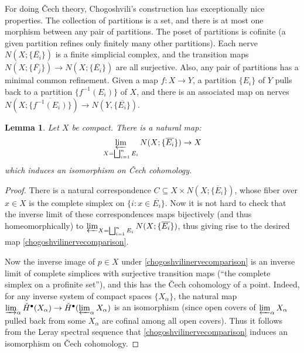 \documentclass[12pt]{article}
\newtheorem{lemma}[theorem]{Lemma}
\theoremstyle{definition}
\theoremstyle{remark}
\numberwithin{equation}{subsection}
\newcommand{\cH}{\check H}
\begin{document}
For doing \v Cech theory, Chogoshvili's construction has exceptionally nice properties.  The collection of partitions is a set, and there is at most one morphism between any pair of partitions.  The poset of partitions is cofinite (a given partition refines only finitely many other partitions).  Each nerve $N(X;\{\overline{E_i}\})$ is a finite simplicial complex, and the transition maps $N(X;\{\overline{F_j}\})\to N(X;\{\overline{E_i}\})$ are all surjective.  Also, any pair of partitions has a minimal common refinement.  Given a map $f:X\to Y$, a partition $\{E_i\}$ of $Y$ pulls back to a partition $\{f^{-1}(E_i)\}$ of $X$, and there is an associated map on nerves $N(X;\{\overline{f^{-1}(E_i)}\})\to N(Y,\{\overline{E_i}\})$.

\begin{lemma}\label{inverselimithassamecech}
Let $X$ be compact.  There is a natural map:
\begin{equation}\label{chogoshvilinervecomparison}
\varprojlim_{X=\bigsqcup_{i=1}^nE_i}N(X;\{\overline{E_i}\})\to X
\end{equation}
which induces an isomorphism on \v Cech cohomology.
\end{lemma}

\begin{proof}
There is a natural correspondence $C\subseteq X\times N(X;\{\overline E_i\})$, whose fiber over $x\in X$ is the complete simplex on $\{i:x\in\overline{E_i}\}$.  Now it is not hard to check that the inverse limit of these correspondences maps bijectively (and thus homeomorphically) to $\varprojlim_{X=\bigsqcup_{i=1}^nE_i}N(X;\{\overline{E_i}\})$, thus giving rise to the desired map \eqref{chogoshvilinervecomparison}.

Now the inverse image of $p\in X$ under \eqref{chogoshvilinervecomparison} is an inverse limit of complete simplices with surjective transition maps (``the complete simplex on a profinite set''), and this has the \v Cech cohomology of a point.  Indeed, for any inverse system of compact spaces $\{X_\alpha\}$, the natural map $\varinjlim_\alpha\cH^\bullet(X_\alpha)\to\cH^\bullet(\varprojlim_\alpha X_\alpha)$ is an isomorphism (since open covers of $\varprojlim_\alpha X_\alpha$ pulled back from some $X_\alpha$ are cofinal among all open covers).  Thus it follows from the Leray spectral sequence that \eqref{chogoshvilinervecomparison} induces an isomorphism on \v Cech cohomology.
\end{proof}
\end{document}
